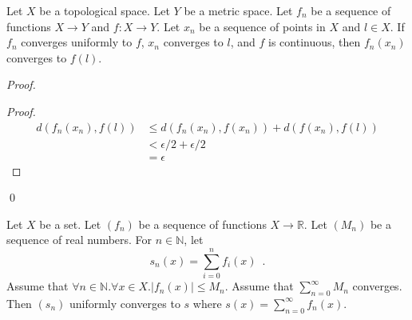 \begin{prop}
Let $X$ be a topological space. Let $Y$ be a metric space. Let $f_n$ be a sequence of functions $X \rightarrow Y$ and $f : X \rightarrow Y$. Let $x_n$ be a sequence of points in $X$ and $l \in X$. If $f_n$ converges uniformly to $f$, $x_n$ converges to $l$, and $f$ is continuous, then $f_n(x_n)$ converges to $f(l)$.
\end{prop}

\begin{proof}
\pf
{}
\begin{proof}
	\pf
	\begin{align*}
		d(f_n(x_n),f(l)) & \leq d(f_n(x_n),f(x_n)) + d(f(x_n),f(l)) \\
		& < \epsilon / 2 + \epsilon / 2 \\
		& = \epsilon
	\end{align*}
\end{proof}
\qed
\end{proof}

\begin{thm}
Let $X$ be a set. Let $(f_n)$ be a sequence of functions $X \rightarrow \mathbb{R}$. Let $(M_n)$ be a sequence of real numbers. For $n \in \mathbb{N}$, let
\[ s_n(x) = \sum_{i=0}^n f_i(x) \enspace . \]
Assume that $\forall n \in \mathbb{N}. \forall x \in X. |f_n(x)| \leq M_n$. Assume that $\sum_{n=0}^\infty M_n$ converges. Then $(s_n)$ uniformly converges to $s$ where $s(x) = \sum_{n=0}^\infty f_n(x)$.
\end{thm}

